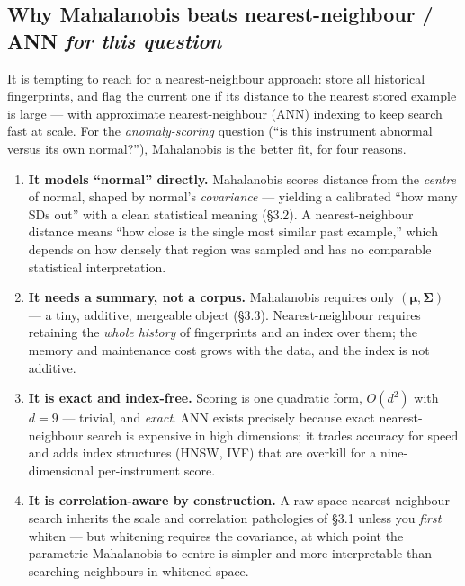 \documentclass[11pt]{article}
\theoremstyle{definition}
\newcommand{\Cov}{\boldsymbol{\Sigma}}
\begin{document}
\subsection{Why Mahalanobis beats nearest-neighbour / ANN \emph{for this question}}

It is tempting to reach for a nearest-neighbour approach: store all historical fingerprints, and flag
the current one if its distance to the nearest stored example is large --- with approximate
nearest-neighbour (ANN) indexing to keep search fast at scale. For the \emph{anomaly-scoring}
question (``is this instrument abnormal versus its own normal?''), Mahalanobis is the better fit, for
four reasons.

\begin{enumerate}[leftmargin=1.5em, itemsep=0.35em]
  \item \textbf{It models ``normal'' directly.} Mahalanobis scores distance from the \emph{centre} of
        normal, shaped by normal's \emph{covariance} --- yielding a calibrated ``how many SDs out''
        with a clean statistical meaning (\S3.2). A nearest-neighbour distance means ``how close is
        the single most similar past example,'' which depends on how densely that region was sampled
        and has no comparable statistical interpretation.
  \item \textbf{It needs a summary, not a corpus.} Mahalanobis requires only
        $(\boldsymbol{\mu}, \Cov)$ --- a tiny, additive, mergeable object (\S3.3). Nearest-neighbour
        requires retaining the \emph{whole history} of fingerprints and an index over them; the
        memory and maintenance cost grows with the data, and the index is not additive.
  \item \textbf{It is exact and index-free.} Scoring is one quadratic form, $O(d^2)$ with $d=9$ ---
        trivial, and \emph{exact}. ANN exists precisely because exact nearest-neighbour search is
        expensive in high dimensions; it trades accuracy for speed and adds index structures
        (HNSW, IVF) that are overkill for a nine-dimensional per-instrument score.
  \item \textbf{It is correlation-aware by construction.} A raw-space nearest-neighbour search
        inherits the scale and correlation pathologies of \S3.1 unless you \emph{first} whiten --- but
        whitening requires the covariance, at which point the parametric Mahalanobis-to-centre is
        simpler and more interpretable than searching neighbours in whitened space.
\end{enumerate}
\end{document}
